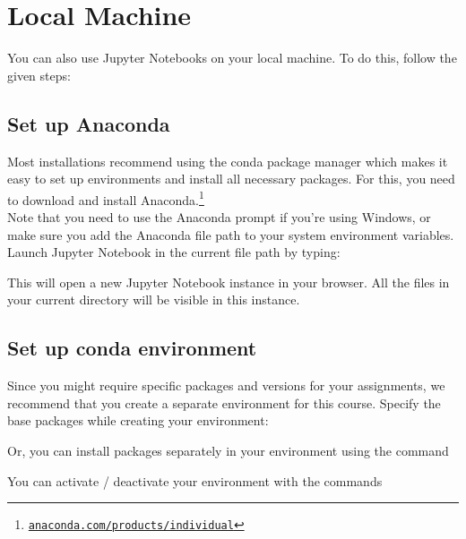 \documentclass[a4paper,10pt]{article}
\begin{document}
\section{Local Machine}
You can also use Jupyter Notebooks on your local machine. To do this, follow the given steps:

\subsection{Set up Anaconda}
\label{subsec:local}
Most installations recommend using the conda package manager which makes it easy to set up environments and install all necessary packages.
For this, you need to download and install Anaconda.\footnote{\href{https://www.anaconda.com/products/individual}{\nolinkurl{anaconda.com/products/individual}}} \\
Note that you need to use the Anaconda prompt if you're using Windows, or make sure you add the Anaconda file path to your system environment variables.\\
Launch Jupyter Notebook in the current file path by typing:

\begin{center}
\end{center}

This will open a new Jupyter Notebook instance in your browser. All the files in your current directory will be visible in this instance.

\subsection{Set up conda environment}
Since you might require specific packages and versions for your assignments, we recommend that you create a separate environment for this course. Specify the base packages while creating your environment:

\begin{center}
\end{center}

Or, you can install packages separately in your environment using the command
\begin{center}
\end{center}

You can activate / deactivate your environment with the commands
\begin{center}
\end{center}
\begin{center}
\end{center}
\end{document}
